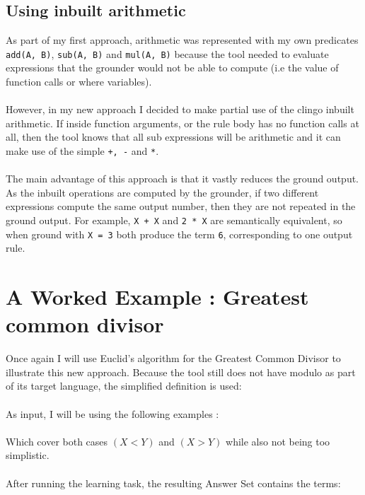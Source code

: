 \subsection{Using inbuilt arithmetic}
As part of my first approach, arithmetic was represented with my own predicates \lstinline{add(A, B)}, \lstinline{sub(A, B)} and \lstinline{mul(A, B)} because the tool needed to evaluate expressions that the grounder would not be able to compute (i.e the value of function calls or where variables). \\ \\ %
However, in my new approach I decided to make partial use of the clingo inbuilt arithmetic. If inside function arguments, or the rule body has no function calls at all, then the tool knows that all sub expressions will be arithmetic and it can make use of the simple \lstinline{+, -} and \lstinline{*}. \\ \\
The main advantage of this approach is that it vastly reduces the ground output. As the inbuilt operations are computed by the grounder, if two different expressions compute the same output number, then they are not repeated in the ground output. For example, \lstinline{X + X} and \lstinline{2 * X} are semantically equivalent, so when ground with \lstinline!X = 3! both produce the term \lstinline!6!, corresponding to one output rule.

\section{A Worked Example : Greatest common divisor}
Once again I will use Euclid's algorithm for the Greatest Common Divisor \cite{Euclid} to illustrate this new approach. Because the tool still does not have modulo as part of its target language, the simplified definition is used: \\

 
\mbox{} \\
As input, I will be using the following examples : \\

 
\mbox{} \\
Which cover both cases $(X < Y)$ and $(X > Y)$ while also not being too simplistic. \\ \\
After running the learning task, the resulting Answer Set contains the terms: \\

